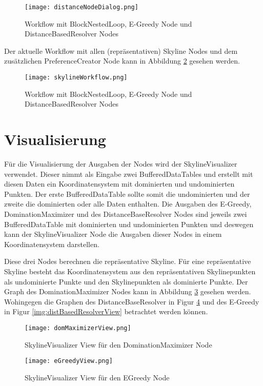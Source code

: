 \begin{figure}[H]
	\centering
	\texttt{[image: distanceNodeDialog.png]}
	\caption{Workflow mit BlockNestedLoop, E-Greedy Node und DistanceBasedResolver Nodes}
	\label{img:distanceOutput}
\end{figure} 

Der aktuelle Workflow mit allen (repräsentativen) Skyline Nodes und dem zusätzlichen PreferenceCreator Node kann in Abbildung \ref{img:skylineWorkflow} gesehen werden.

\begin{figure}[H]
	\centering
	\texttt{[image: skylineWorkflow.png]}
	\caption{Workflow mit BlockNestedLoop, E-Greedy Node und DistanceBasedResolver Nodes}
	\label{img:skylineWorkflow}
\end{figure} 
\section{Visualisierung}
\label{ch:Evaluierung:sec:visualize}
Für die Visualisierung der Ausgaben der Nodes wird der SkylineVisualizer verwendet. Dieser nimmt als Eingabe zwei BufferedDataTables und erstellt mit diesen Daten ein Koordinatensystem mit dominierten und undominierten Punkten. Der erste BufferedDataTable sollte somit die undominierten und der zweite die dominierten oder alle Daten enthalten. Die Ausgaben des E-Greedy, DominationMaximizer und des DistanceBaseResolver Nodes sind jeweils zwei BufferedDataTable mit dominierten und undominierten Punkten und deswegen kann der SkylineVisualizer Node die Ausgaben dieser Nodes in einem Koordinatensystem darstellen.

Diese drei Nodes berechnen die repräsentative Skyline. Für eine repräsentative Skyline besteht das Koordinatensystem aus den repräsentativen Skylinepunkten als undominierte Punkte und den Skylinepunkten als dominierte Punkte. Der Graph des DominationMaximizer Nodes kann in Abbildung \ref{img:domMaximizerView} gesehen werden. Wohingegen die Graphen des DistanceBaseResolver in Figur \ref{img:eGreedyView} und des E-Greedy in Figur \ref{img:distBasedResolverView} betrachtet werden können.

\begin{figure}[H]
	\centering
	\texttt{[image: domMaximizerView.png]}
	\caption{SkylineVisualizer View für den DominationMaximizer Node}
	\label{img:domMaximizerView}
	
\end{figure} 
	\begin{figure}[H]
	\centering
	\texttt{[image: eGreedyView.png]}
	\caption{SkylineVisualizer View für den EGreedy Node}
	\label{img:eGreedyView}
\end{figure} 

